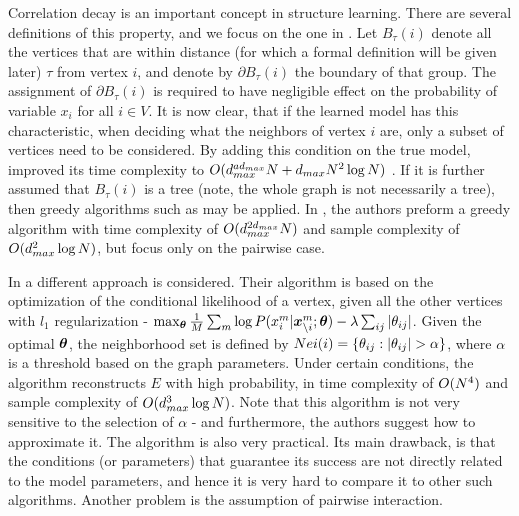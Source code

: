 Correlation decay is an important concept in structure learning.
There are several definitions of this property, and we focus on the one in \cite{montanari2009graphical}.
Let $B_{\tau}(i)$ denote all the vertices that are within distance (for which a formal definition will be given later) $\tau$ from vertex $i$, and denote by $\partial B_{\tau}(i)$ the boundary of that group.
The assignment of $\partial B_{\tau}(i)$ is required to have negligible effect on the probability of variable $x_i$ for all $i \in V$.
It is now clear, that if the learned model has this characteristic, when deciding what the neighbors of vertex $i$ are, only a subset of vertices need to be considered.
By adding this condition on the true model, \cite{bresler2008reconstruction} improved its time complexity to $O(d_{max}^{ad_{max}}N+d_{max}N^2\log N)$ .
If it is further assumed that $B_{\tau}(i)$ is a tree (note, the whole graph is not necessarily a tree), then greedy algorithms such as \cite{netrapalli2010greedy, anandkumar2013learning} may be applied.
In \cite{anandkumar2013learning}, the authors preform a greedy algorithm with time complexity of $O(d_{max}^{2d_{max}}{N})$ and sample complexity of $O(d_{max}^2\log N)$, but focus only on the pairwise case.  

In \cite{ravikumar2010high} a different approach is considered. Their algorithm is based on the optimization of the conditional likelihood of a vertex, given all the other vertices with $l_1$ regularization - $\max_{\boldsymbol{\theta}} \frac{1}{M}\sum_m \log P(x^{m}_i| \boldsymbol{x}^m_{\setminus i};\boldsymbol{\theta}) - \lambda \sum_{ij} |\theta_{ij}|$.
Given the optimal $\boldsymbol{\theta}$, the neighborhood set is defined by $Nei(i) = \{\theta_{ij} : |\theta_{ij}| > \alpha\}$, where $\alpha$ is a threshold based on the graph parameters.
Under certain conditions, the algorithm reconstructs $E$ with high probability, in time complexity of $O({N}^4)$ and sample complexity of $O( d_{max}^3 \log {N})$.
Note that this algorithm is not very sensitive to the selection of $\alpha$ - and furthermore, the authors suggest how to approximate it.
The algorithm is also very practical.
Its main drawback, is that the conditions (or parameters) that guarantee its success are not directly related to the model parameters, and hence it is very hard to compare it to other such algorithms. Another problem is the assumption of pairwise interaction.     

